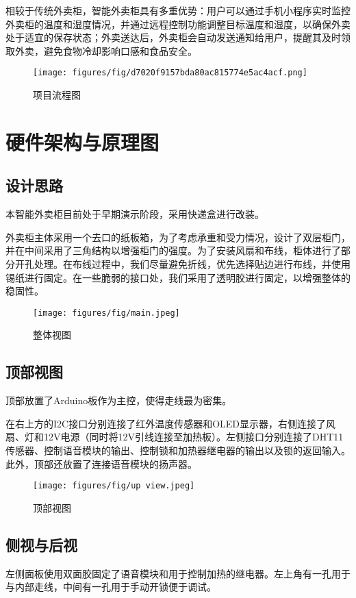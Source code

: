 \documentclass[12pt,hyperref,a4paper,UTF8]{ctexart}
\begin{document}
相较于传统外卖柜，智能外卖柜具有多重优势：用户可以通过手机小程序实时监控外卖柜的温度和湿度情况，并通过远程控制功能调整目标温度和湿度，以确保外卖处于适宜的保存状态；外卖送达后，外卖柜会自动发送通知给用户，提醒其及时领取外卖，避免食物冷却影响口感和食品安全。
\begin{figure}[H]
    \centering
    \texttt{[image: figures/fig/d7020f9157bda80ac815774e5ac4acf.png]}
    \caption{项目流程图}
    \label{fig:enter-label}
\end{figure}



\section{硬件架构与原理图}
\subsection*{设计思路}
本智能外卖柜目前处于早期演示阶段，采用快递盒进行改装。

外卖柜主体采用一个去口的纸板箱，为了考虑承重和受力情况，设计了双层柜门，并在中间采用了三角结构以增强柜门的强度。为了安装风扇和布线，柜体进行了部分开孔处理。在布线过程中，我们尽量避免折线，优先选择贴边进行布线，并使用锡纸进行固定。在一些脆弱的接口处，我们采用了透明胶进行固定，以增强整体的稳固性。
\begin{figure}[H]
    \centering
    \texttt{[image: figures/fig/main.jpeg]}
    \caption{整体视图}
    \label{fig:enter-label}
\end{figure}
\subsection*{顶部视图}
顶部放置了Arduino板作为主控，使得走线最为密集。

在右上方的I2C接口分别连接了红外温度传感器和OLED显示器，右侧连接了风扇、灯和12V电源（同时将12V引线连接至加热板）。左侧接口分别连接了DHT11传感器、控制语音模块的输出、控制锁和加热器继电器的输出以及锁的返回输入。此外，顶部还放置了连接语音模块的扬声器。

\begin{figure}[H]
    \centering
    \texttt{[image: figures/fig/up view.jpeg]}
    \caption{顶部视图}
    \label{fig:enter-label}
\end{figure}


\subsection*{侧视与后视}
左侧面板使用双面胶固定了语音模块和用于控制加热的继电器。左上角有一孔用于与内部走线，中间有一孔用于手动开锁便于调试。
\end{document}
